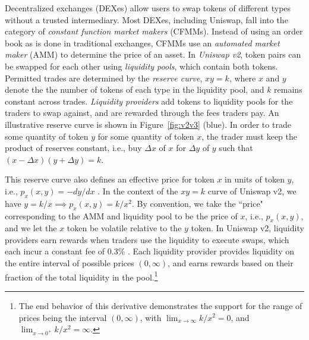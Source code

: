 \documentclass[sigconf, usenames, dvipsnames]{acmart}
\begin{document}
Decentralized exchanges (DEXes) allow users to swap tokens of different types without a trusted intermediary. Most DEXes, including Uniswap, fall into the category of {\em constant function market makers} (CFMMs). 
Instead of using an order book as is done in traditional exchanges, CFMMs use an {\em automated market maker} (AMM)  to determine the price of an asset. In {\em Uniswap v2}, token pairs can be swapped for each other using {\em liquidity pools}, which contain both tokens. Permitted trades are determined by the {\em reserve curve}, $x y= k$, where $x$ and $y$ denote the the number of tokens of each type in the liquidity pool, and $k$ remains constant across trades. {\em Liquidity providers} add tokens to liquidity pools for the traders to swap against, and are rewarded through the fees traders pay. An illustrative reserve curve is shown in Figure~\ref{fig:v2v3} (blue). In order to trade some quantity of token $y$ for some quantity of token $x$, the trader must keep the product of reserves constant, i.e., buy $\Delta x$ of $x$ for $\Delta y$ of $y$ such that $(x-\Delta x) (y + \Delta y) = k$.

This reserve curve also defines an effective price for token $x$ in units of token $y$, i.e., $p_x(x,y) = -dy/dx$ \cite{krishnamachari2021dynamic}. In the context of the $xy = k$ curve of Uniswap v2, we have $y=k/x \implies p_x(x,y) = k/x^2$. By convention, we take the ``price" corresponding to the AMM and liquidity pool to be the price of $x$, i.e., $p_x(x,y)$, and we let the $x$ token be volatile relative to the $y$ token.
%
In Uniswap v2, liquidity providers earn rewards when traders use the liquidity to execute swaps, which each incur a constant fee of 0.3\% \cite{adams2020uniswap}. Each liquidity provider provides liquidity on the entire interval of possible prices $(0, \infty)$, and earns rewards based on their fraction of the total liquidity in the pool.\footnote{The end behavior of this derivative demonstrates the support for the range of prices being the interval $(0,\infty)$, with $\lim_{x\to \infty} k/x^2 = 0$, and $\lim_{x\to 0^+} k/x^2 = \infty$.}
\end{document}
